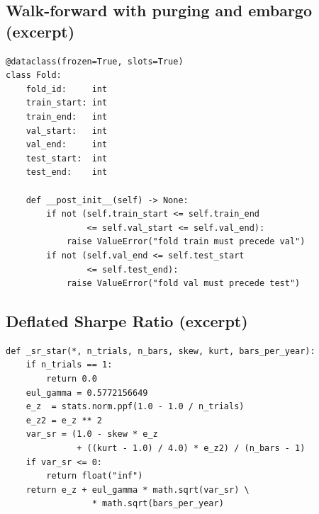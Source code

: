 \documentclass[11pt,a4paper]{article}
\providecommand{\srmin}{S^{\ast}}
\begin{document}
\subsection{Walk-forward with purging and embargo (excerpt)}
\begin{lstlisting}[caption={Excerpt of \texttt{kairon/splits/walkforward.py}: a
single (train, val, test) fold. The two
invariants---$\mathrm{train\_end}\le\mathrm{val\_start}\le
\mathrm{val\_end}\le\mathrm{test\_start}$ and the
non-emptiness of every window---are enforced in
\texttt{\_\_post\_init\_\_}.},label={lst:fold}]
@dataclass(frozen=True, slots=True)
class Fold:
    fold_id:     int
    train_start: int
    train_end:   int
    val_start:   int
    val_end:     int
    test_start:  int
    test_end:    int

    def __post_init__(self) -> None:
        if not (self.train_start <= self.train_end
                <= self.val_start <= self.val_end):
            raise ValueError("fold train must precede val")
        if not (self.val_end <= self.test_start
                <= self.test_end):
            raise ValueError("fold val must precede test")
\end{lstlisting}

\subsection{Deflated Sharpe Ratio (excerpt)}
\begin{lstlisting}[caption={Excerpt of \texttt{kairon/backtest/statistics.py}: the haircut
threshold $\srmin$ of Bailey \& López de Prado (2014).
$N_t$ is the number of trials; $n$ the backtest length;
$\gamma_3,\gamma_4$ the skewness and kurtosis of returns.},label={lst:dsr}]
def _sr_star(*, n_trials, n_bars, skew, kurt, bars_per_year):
    if n_trials == 1:
        return 0.0
    eul_gamma = 0.5772156649
    e_z  = stats.norm.ppf(1.0 - 1.0 / n_trials)
    e_z2 = e_z ** 2
    var_sr = (1.0 - skew * e_z
              + ((kurt - 1.0) / 4.0) * e_z2) / (n_bars - 1)
    if var_sr <= 0:
        return float("inf")
    return e_z + eul_gamma * math.sqrt(var_sr) \
                 * math.sqrt(bars_per_year)
\end{lstlisting}
\end{document}
